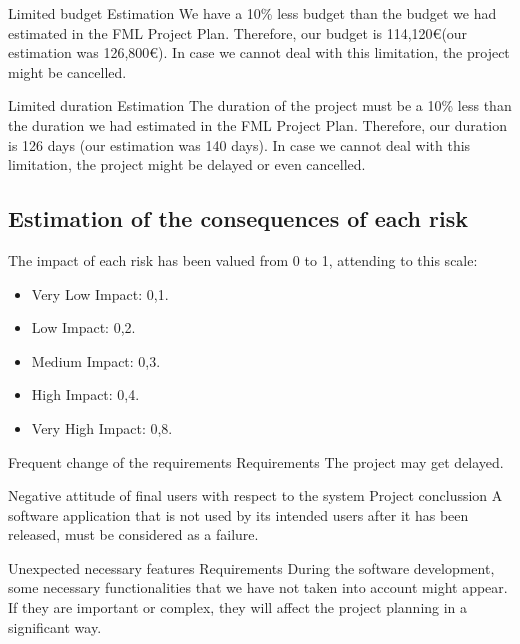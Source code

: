 \begin{risk}{Limited budget}
\riskcat Estimation
\riskdesc We have a 10\% less budget than the budget we had estimated in the FML Project Plan. Therefore, our budget is 114,120\euro (our estimation was 126,800\euro). In case we cannot deal with this limitation, the project might be cancelled.
\end{risk}

\begin{risk}{Limited duration}
\riskcat Estimation
\riskdesc The duration of the project must be a 10\% less than the duration we had estimated in the FML Project Plan. Therefore, our duration is 126 days (our estimation was 140 days). In case we cannot deal with this limitation, the project might be delayed or even cancelled.
\end{risk}



\subsection{Estimation of the consequences of each risk}

The impact of each risk has been valued from 0 to 1, attending to this scale:
\begin{itemize}
\item Very Low Impact: 0,1.
\item Low Impact: 0,2.
\item Medium Impact: 0,3.
\item High Impact: 0,4.
\item Very High Impact: 0,8.
\end{itemize}

\begin{risk}{Frequent change of the requirements}
\riskcat Requirements
 The project may get delayed.
\end{risk}

\begin{risk}{Negative attitude of final users with respect to the system}
\riskcat Project conclussion
\riskdesc A software application that is not used by its intended users after it has been released, must be considered as a failure. 
\end{risk}

\begin{risk}{Unexpected necessary features}
\riskcat Requirements
\riskdesc During the software development, some necessary functionalities that we have not taken into account might appear. If they are important or complex, they will affect the project planning in a significant way.
\end{risk}

